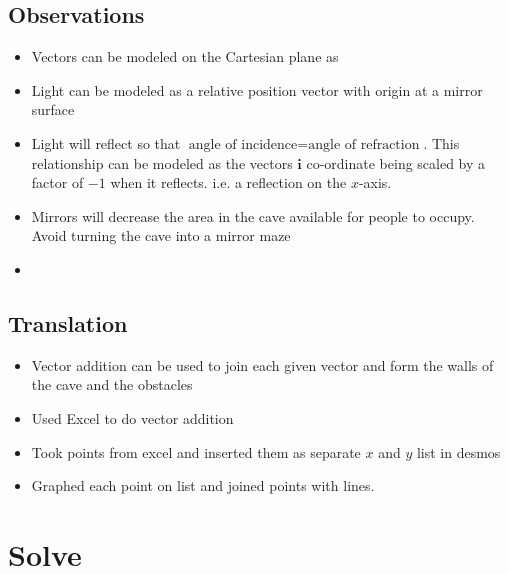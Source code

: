 \documentclass[11pt, letterpaper]{article}
\begin{document}
\subsection{Observations}
\par
\begin{itemize}
\item Vectors can be modeled on the Cartesian plane as 

\item Light can be modeled as a relative position vector with origin at a mirror surface

\item Light will reflect so that $\textrm{angle  of incidence} = \textrm{angle of refraction}$. This relationship can be modeled as the vectors $\bm{i}$ co-ordinate being scaled by a factor of $-1$ when it reflects. i.e. a reflection on the $x$-axis.

\item Mirrors will decrease the area in the cave available for people to occupy. Avoid turning the cave into a mirror maze

\item  
\end{itemize}





\subsection{Translation}
\par 

\begin{itemize}
\item Vector addition can be used to join each given vector and form the walls of the cave and the obstacles

\item Used Excel to do vector addition

\item Took points from excel and inserted them as separate $x$ and $y$ list in desmos

\item Graphed each point on list and joined points with lines.
\end{itemize}


\par 


\section{Solve}
\end{document}
